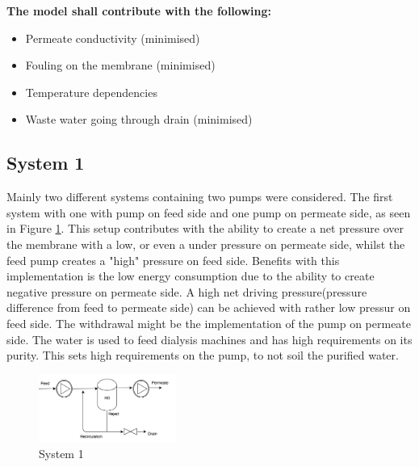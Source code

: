 \textbf{The model shall contribute with the following:}
\begin{itemize}
\renewcommand\labelitemi{ }
\item Permeate conductivity (minimised)
\item Fouling on the membrane (minimised)
\item Temperature dependencies 
\item Waste water going through drain (minimised)
\end{itemize}

\subsection{System 1}
Mainly two different systems containing two pumps were considered. The first system with one with pump on feed side and one pump on permeate side, as seen in Figure \ref{fig:FlowCInves1}. This setup contributes with the ability to create a net pressure over the membrane with a low, or even a under pressure on permeate side, whilst the feed pump creates a "high" pressure on feed side. Benefits with this implementation is the low energy consumption due to the ability to create negative pressure on permeate side. A high net driving pressure(pressure difference from feed to permeate side) can be achieved with rather low pressur on feed side. The withdrawal might be the implementation of the pump on permeate side. The water is used to feed dialysis machines and has high requirements on its purity. This sets high requirements on the pump, to not soil the purified water. 

\begin{figure}[h]
    \centering
    \includegraphics[width=0.4\textwidth]{FlowCInves1}
    \caption{System 1}
    \label{fig:FlowCInves1}
\end{figure}

